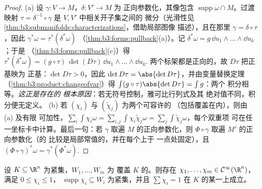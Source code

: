\begin{proof}
(a) 设 $\gamma\colon V \to M$，$\delta\colon V' \to M$ 为
正向参数化，其像包含
$\operatorname{supp}\omega\cap M$。过渡映射 $\tau =
\delta^{-1}\circ\gamma$ 是 $V, V'$ 中相关开子集之间的
微分（光滑性见
\cref{thm:b3:submanifolds:characterizations}，借助局部图像
描述），且在那里 $\gamma = \delta\circ\tau$，因此
$\gamma^*\omega = \tau^*(\delta^*\omega)$
（\cref{thm:b3:forms:pullback}(a)）。记 $\delta^*\omega =
g\,\dd u_1\wedge\dots\wedge\dd u_k$；于是
（\cref{thm:b3:forms:pullback}(c)）得 $\tau^*(\delta^*\omega) =
(g\circ\tau)\,\det(D\tau)\,\dd u_1\wedge\dots\wedge\dd u_k$.
两个标架都是正向的，故 $D\tau$ 把正基映为
正基：$\det D\tau > 0$，因此 $\det D\tau =
\abs{\det D\tau}$，并由变量替换定理
（\cref{thm:b3:product:changeofvar}）得
$\int(g\circ\tau)\abs{\det D\tau} = \int g$：两个
积分相等。\emph{这正是存在的
根本原因}：若无符号控制，雅可比行列式及其
绝对值不同，积分便无定义。
(b) 若 $(\chi_i)$ 与 $(\tilde\chi_j)$ 为两个可容许的
（包括覆盖在内），则由 (a) 及有限
可加性，$\sum_i\int\chi_i\omega =
\sum_{i,j}\int\chi_i\tilde\chi_j\omega =
\sum_j\int\tilde\chi_j\omega$，每个双重项
可在任一坐标卡中计算。最后一句：若 $\gamma$ 取遍
$M$ 的正向参数化，则 $\Phi\circ\gamma$ 取遍
$M'$ 的正向参数化（的
比较是局部常值的，并在每个上于
一点处固定），且 $(\Phi\circ\gamma)^*\omega =
\gamma^*(\Phi^*\omega)$.
\end{proof}

\begin{lemma}
\label{lem:b3:forms:partition}
设 $K \subseteq \R^n$ 为紧集，$W_1, \dots, W_m$ 为
覆盖 $K$ 的。则存在 $\chi_1, \dots, \chi_m \in
\mathcal C^\infty(\R^n)$，满足 $0 \leq \chi_i \leq 1$，
$\operatorname{supp}\chi_i \subseteq W_i$ 为紧集，并且
$\sum\chi_i = 1$ 在
$K$ 的某一上成立。
\end{lemma}


